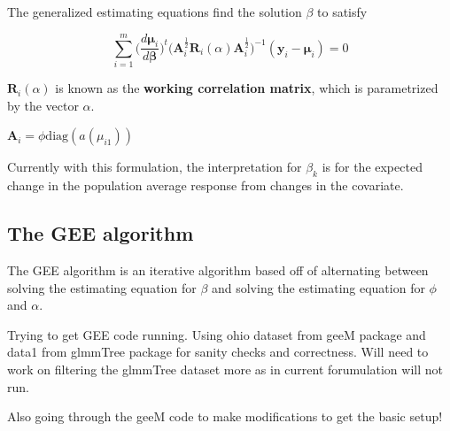 \documentclass[10pt]{article}
\begin{document}
The generalized estimating equations find the solution $\beta $ to satisfy

$$\sum_{i = 1}^m \bigg(\frac{d \boldsymbol\mu_i}{d \boldsymbol\beta}\bigg)^t \bigg(\mathbf{A}_i^{\frac{1}{2}} \mathbf{R}_i(\alpha) \mathbf{A}_i^{\frac{1}{2}}\bigg)^{-1}(\mathbf{y}_i - \boldsymbol\mu_i) = 0$$


$\mathbf{R}_i(\alpha)$ is known as the \textbf{working correlation matrix}, which is parametrized by the vector $\alpha$.

$\mathbf{A}_i = \phi\text{diag}(a(\mu_{i1}))$


Currently with this formulation, the interpretation for $\beta_k$ is for the expected change in the population average response from changes in the covariate.


\subsection{The GEE algorithm}

The GEE algorithm is an iterative algorithm based off of  alternating between solving the estimating equation for $\beta$ and solving the estimating equation for $\phi$ and $\alpha$.





Trying to get GEE code running. Using ohio dataset from geeM package and data1 from glmmTree package for sanity checks and correctness. Will need to work on filtering the glmmTree dataset more as in current forumulation will not run.

Also going through the geeM code to make modifications to get the basic setup!










\end{document}
